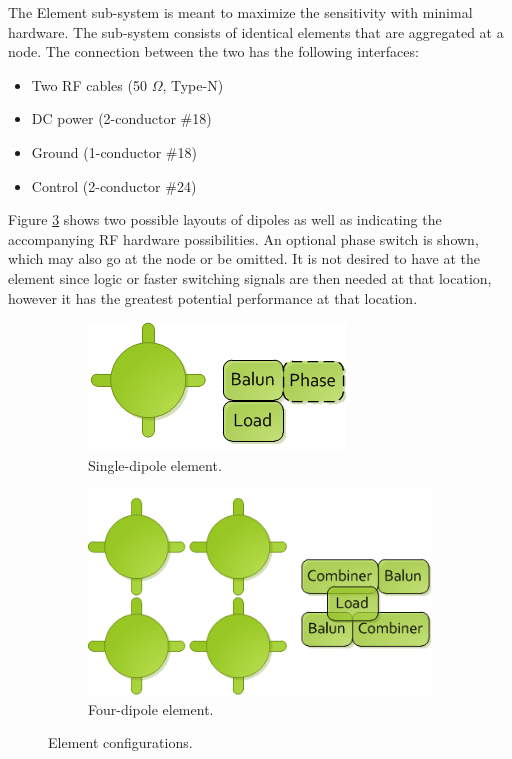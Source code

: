 \documentclass[11pt]{article}
\begin{document}
The Element sub-system is meant to maximize the sensitivity with minimal
hardware.  The sub-system consists of identical elements that are aggregated at
a node.  The connection between the two has the following interfaces:

\begin{itemize}
\item Two RF cables (50 $\Omega$, Type-N)
\item DC power (2-conductor \#18)
\item Ground (1-conductor \#18)
\item Control (2-conductor \#24)
\end{itemize}

Figure \ref{fig:elements} shows two possible layouts of dipoles as well as
indicating the accompanying RF hardware possibilities.  An optional phase
switch is shown, which may also go at the node or be omitted.  It is not
desired to have at the element since logic or faster switching signals are then
needed at that location, however it has the greatest potential performance at
that location.

\begin{figure}
\begin{subfigure}[h]{0.5\textwidth}
\centering
\includegraphics[width=\textwidth]{plots/Element1.png}
\caption{Single-dipole element.}
\label{fig:element1}
\end{subfigure}
\begin{subfigure}{0.5\textwidth}
\centering
\includegraphics[width=\textwidth]{plots/Element4.png}
\caption{Four-dipole element.}
\label{fig:element4}
\end{subfigure}
\caption{Element configurations.}
\label{fig:elements}
\end{figure}
\end{document}
